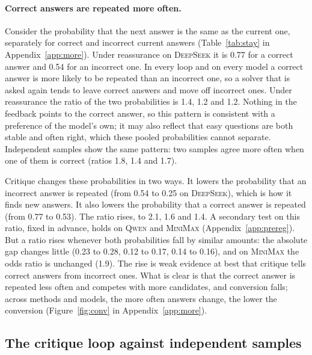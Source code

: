 \documentclass[11pt]{article}
\newcommand{\ds}{\textsc{DeepSeek}}
\newcommand{\qw}{\textsc{Qwen}}
\newcommand{\mm}{\textsc{MiniMax}}
\begin{document}
\paragraph{Correct answers are repeated more often.}
Consider the probability that the next answer is the same as the current one, separately for correct and incorrect current answers (Table~\ref{tab:stay} in Appendix~\ref{app:more}).
Under reassurance on \ds{} it is 0.77 for a correct answer and 0.54 for an incorrect one.
In every loop and on every model a correct answer is more likely to be repeated than an incorrect one, so a solver that is asked again tends to leave correct answers and move off incorrect ones.
Under reassurance the ratio of the two probabilities is 1.4, 1.2 and 1.2.
Nothing in the feedback points to the correct answer, so this pattern is consistent with a preference of the model's own; it may also reflect that easy questions are both stable and often right, which these pooled probabilities cannot separate.
Independent samples show the same pattern: two samples agree more often when one of them is correct (ratios 1.8, 1.4 and 1.7).

Critique changes these probabilities in two ways.
It lowers the probability that an incorrect answer is repeated (from 0.54 to 0.25 on \ds), which is how it finds new answers.
It also lowers the probability that a correct answer is repeated (from 0.77 to 0.53).
The ratio rises, to 2.1, 1.6 and 1.4.
A secondary test on this ratio, fixed in advance, holds on \qw{} and \mm{} (Appendix~\ref{app:prereg}).
But a ratio rises whenever both probabilities fall by similar amounts: the absolute gap changes little (0.23 to 0.28, 0.12 to 0.17, 0.14 to 0.16), and on \mm{} the odds ratio is unchanged (1.9).
The rise is weak evidence at best that critique tells correct answers from incorrect ones.
What is clear is that the correct answer is repeated less often and competes with more candidates, and conversion falls; across methods and models, the more often answers change, the lower the conversion (Figure~\ref{fig:conv} in Appendix~\ref{app:more}).



\subsection{The critique loop against independent samples}
\label{sec:samples}
\end{document}

